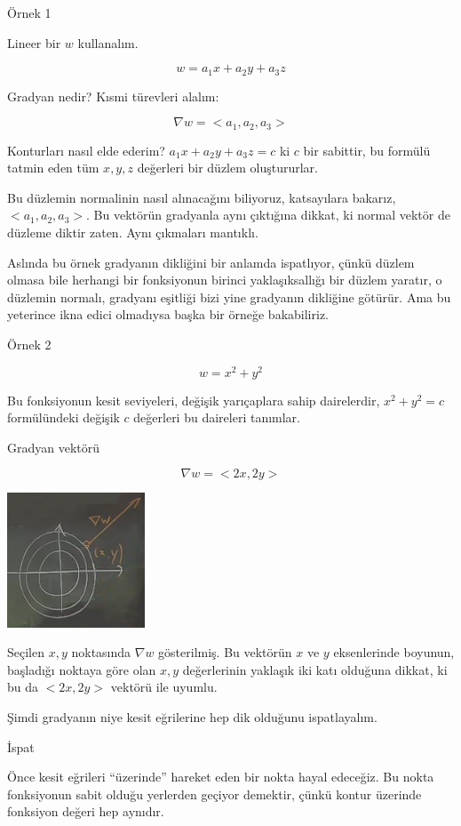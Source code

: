\documentclass[12pt,fleqn]{article}\usepackage{../../common}
\begin{document}
Örnek 1

Lineer bir $w$ kullanalım. 

$$ w = a_1 x + a_2 y + a_3 z $$

Gradyan nedir? Kısmi türevleri alalım:

$$
\nabla w = < a_1, a_2, a_3 >
$$

Konturları nasıl elde ederim? $a_1 x + a_2 y + a_3 z  = c$ ki $c$ bir
sabittir, bu formülü tatmin eden tüm $x,y,z$ değerleri bir düzlem
oluştururlar. 

Bu düzlemin normalinin nasıl alınacağını biliyoruz, katsayılara bakarız,
$< a_1,a_2,a_3 >$. Bu vektörün gradyanla aynı çıktığına dikkat, ki normal vektör de
düzleme diktir zaten. Aynı çıkmaları mantıklı.

Aslında bu örnek gradyanın dikliğini bir anlamda ispatlıyor, çünkü düzlem olmasa
bile herhangi bir fonksiyonun birinci yaklaşıksallığı bir düzlem yaratır, o
düzlemin normalı, gradyanı eşitliği bizi yine gradyanın dikliğine götürür. Ama
bu yeterince ikna edici olmadıysa başka bir örneğe bakabiliriz.

Örnek 2

$$ w = x^2 + y^2 $$

Bu fonksiyonun kesit seviyeleri, değişik yarıçaplara sahip dairelerdir,
$x^2 + y^2 = c$ formülündeki değişik $c$ değerleri bu daireleri tanımlar. 

Gradyan vektörü


$$ \nabla w = <2x, 2y> $$
\begin{center}
\includegraphics[height=4cm]{12_2.png}
\end{center}
Seçilen $x,y$ noktasında $\nabla w$ gösterilmiş. Bu vektörün $x$ ve $y$
eksenlerinde boyunun, başladığı noktaya göre olan $x,y$ değerlerinin
yaklaşık iki katı olduğuna dikkat, ki bu da $< 2x,2y >$ vektörü ile uyumlu. 

Şimdi gradyanın niye kesit eğrilerine hep dik olduğunu ispatlayalım.

İspat

Önce kesit eğrileri ``üzerinde'' hareket eden bir nokta hayal edeceğiz. Bu
nokta fonksiyonun sabit olduğu yerlerden geçiyor demektir, çünkü kontur
üzerinde fonksiyon değeri hep aynıdır. 
\end{document}
